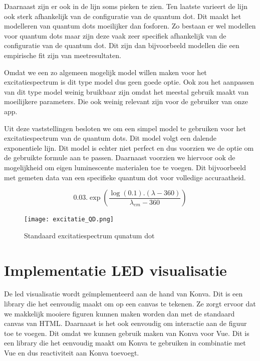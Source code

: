 Daarnaast zijn er ook in de lijn soms pieken te zien. Ten laatste varieert de lijn ook sterk afhankelijk van de configuratie van de quantum dot. Dit maakt het modelleren van quantum dots moeilijker dan fosforen. Zo bestaan er wel modellen voor quantum dots maar
zijn deze vaak zeer specifiek afhankelijk van de configuratie van de quantum dot. Dit zijn dan bijvoorbeeld modellen die een empirische fit zijn van meetresultaten.

Omdat we een zo algemeen mogelijk model willen maken voor het excitatiespectrum is dit type model dus geen goede optie. Ook zou het aanpassen van dit type
model weinig bruikbaar zijn omdat het meestal gebruik maakt van moeilijkere parameters. Die ook weinig relevant zijn voor de gebruiker van onze app.

Uit deze vaststellingen besloten we om een simpel model te gebruiken voor het excitatiespectrum
van de quantum dots. Dit model volgt een dalende exponentiele lijn. Dit model is echter niet
perfect en dus voorzien we de optie om de gebruikte formule aan te passen. Daarnaast voorzien we hiervoor ook de mogelijkheid om eigen luminescente materialen toe te voegen. Dit bijvoorbeeld met gemeten data van een specifieke quantum dot voor volledige accuraatheid.

\begin{equation}
    0.03 . \exp\left(\frac{\log(0.1) . (\lambda - 360)}{\lambda_{em} - 360}\right)
\end{equation}

\begin{figure}[H]
    \centering
    \texttt{[image: excitatie\_QD.png]}
    \caption{Standaard excitatiespectrum qunatum dot}%
    \label{fig:basic_ex_QD}
\end{figure}

\section{Implementatie LED visualisatie}

De led visualisatie wordt ge\"implementeerd aan de hand van Konva. Dit is een library die het eenvoudig maakt om op een canvas te tekenen. Ze zorgt ervoor dat we makkelijk mooiere figuren kunnen maken worden dan met de standaard canvas van HTML. Daarnaast is het ook eenvoudig om interactie aan de figuur toe te voegen. Dit omdat we kunnen gebruik maken van Konva voor Vue. Dit is een library die het eenvoudig maakt om Konva te gebruiken in combinatie met Vue en dus reactiviteit aan Konva toevoegt.

